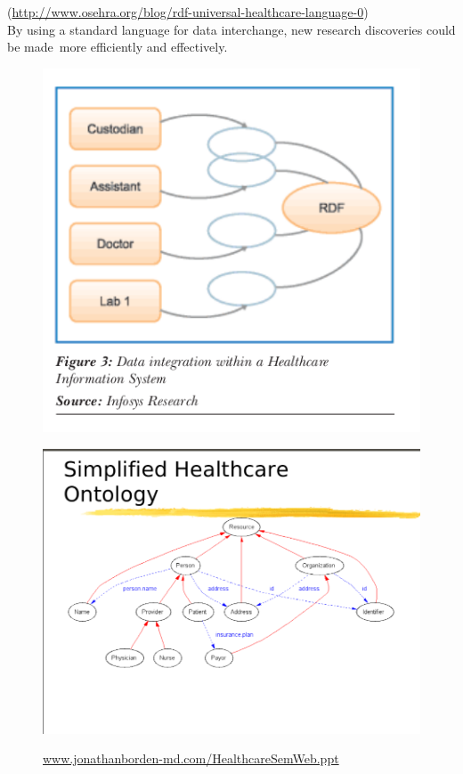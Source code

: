 \documentclass[DIV=calc, paper=a4, fontsize=12pt, onecolumn]{scrartcl}	 %
\begin{document}
  (\url{http://www.osehra.org/blog/rdf-universal-healthcare-language-0})\\

  By using a standard language for data interchange, new research discoveries could be made\
  more efficiently and effectively.\

  \begin{figure}[ht!]
    \centering
    \includegraphics[scale=0.65]{rdfh.png}
    \caption{\citep{parachuri2008role}}
    \label{fig:rdfh}
  \end{figure}

  \begin{figure}[ht!]
    \centering
    \includegraphics[scale=0.4]{rdf1.png}\\
    \caption{\url{www.jonathanborden-md.com/HealthcareSemWeb.ppt‎}}
    \label{fig:rdf1}
  \end{figure}
   
\end{document}
